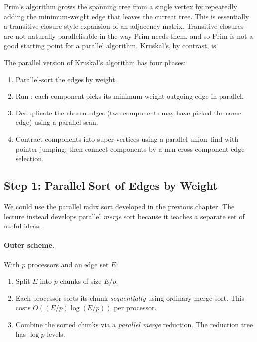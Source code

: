 \begin{ppnote}
Prim's algorithm grows the spanning tree from a single vertex by
repeatedly adding the minimum-weight edge that leaves the current
tree.  This is essentially a transitive-closure-style expansion of an
adjacency matrix.  Transitive closures are not naturally parallelisable
in the way Prim needs them, and so Prim is not a good starting point
for a parallel algorithm.  Kruskal's, by contrast, is.
\end{ppnote}

The parallel version of Kruskal's algorithm has four phases:
\begin{enumerate}
  \item Parallel-sort the edges by weight.
  \item Run : each component picks its
        minimum-weight outgoing edge in parallel.
  \item Deduplicate the chosen edges (two components may have picked
        the same edge) using a parallel scan.
  \item Contract components into super-vertices using a parallel
        union--find with pointer jumping; then connect components by
        a min cross-component edge selection.
\end{enumerate}

\subsection{Step 1: Parallel Sort of Edges by Weight}

We could use the parallel radix sort developed in the previous
chapter.  The lecture instead develops parallel \emph{merge} sort
because it teaches a separate set of useful ideas.

\paragraph{Outer scheme.}
With $p$ processors and an edge set $E$:
\begin{enumerate}
  \item Split $E$ into $p$ chunks of size $E/p$.
  \item Each processor sorts its chunk \emph{sequentially} using
        ordinary merge sort.  This costs
        $O((E/p) \log (E/p))$ per processor.
  \item Combine the sorted chunks via a \emph{parallel merge}
        reduction.  The reduction tree has $\log p$ levels.
\end{enumerate}

